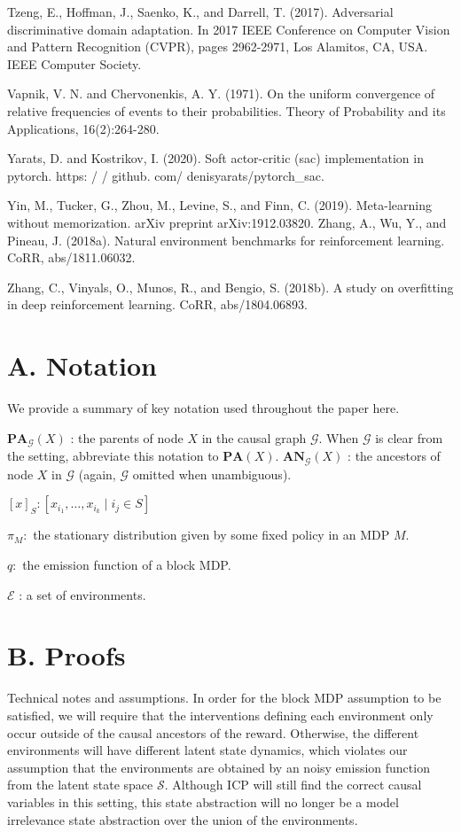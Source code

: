 \documentclass[10pt]{article}
\begin{document}
Tzeng, E., Hoffman, J., Saenko, K., and Darrell, T. (2017). Adversarial discriminative domain adaptation. In 2017 IEEE Conference on Computer Vision and Pattern Recognition (CVPR), pages 2962-2971, Los Alamitos, CA, USA. IEEE Computer Society.

Vapnik, V. N. and Chervonenkis, A. Y. (1971). On the uniform convergence of relative frequencies of events to their probabilities. Theory of Probability and its Applications, 16(2):264-280.

Yarats, D. and Kostrikov, I. (2020). Soft actor-critic (sac) implementation in pytorch. https: / / github. com/ denisyarats/pytorch\_sac.

Yin, M., Tucker, G., Zhou, M., Levine, S., and Finn, C. (2019). Meta-learning without memorization. arXiv preprint arXiv:1912.03820. Zhang, A., Wu, Y., and Pineau, J. (2018a). Natural environment benchmarks for reinforcement learning. CoRR, abs/1811.06032.

Zhang, C., Vinyals, O., Munos, R., and Bengio, S. (2018b). A study on overfitting in deep reinforcement learning. CoRR, abs/1804.06893.

\section{A. Notation}
We provide a summary of key notation used throughout the paper here.

$\mathbf{P A}_{\mathcal{G}}(X)$ : the parents of node $X$ in the causal graph $\mathcal{G}$. When $\mathcal{G}$ is clear from the setting, abbreviate this notation to $\mathbf{P A}(X)$. $\mathbf{A N}_{\mathcal{G}}(X)$ : the ancestors of node $X$ in $\mathcal{G}$ (again, $\mathcal{G}$ omitted when unambiguous).

$[x]_{S}:\left[x_{i_{1}}, \ldots, x_{i_{k}} \mid i_{j} \in S\right]$

$\pi_{M}:$ the stationary distribution given by some fixed policy in an MDP $M$.

$q:$ the emission function of a block MDP.

$\mathcal{E}$ : a set of environments.

\section{B. Proofs}
Technical notes and assumptions. In order for the block MDP assumption to be satisfied, we will require that the interventions defining each environment only occur outside of the causal ancestors of the reward. Otherwise, the different environments will have different latent state dynamics, which violates our assumption that the environments are obtained by an noisy emission function from the latent state space $\mathcal{S}$. Although ICP will still find the correct causal variables in this setting, this state abstraction will no longer be a model irrelevance state abstraction over the union of the environments.
\end{document}
